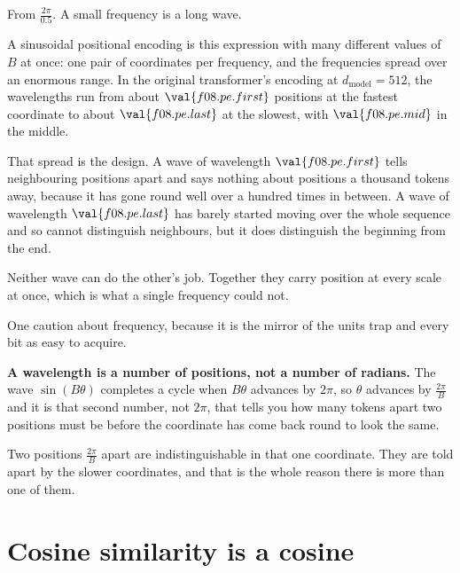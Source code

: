 \begin{fr}
\ans{$4\pi$}
From $\frac{2\pi}{\num{0.5}}$. A small frequency is a long wave.

\begin{aibox}
A sinusoidal positional encoding is this expression with many different values
of $B$ at once: one pair of coordinates per frequency, and the frequencies
spread over an enormous range. In the original transformer's encoding at
$d_{\text{model}} = 512$, the wavelengths run from about
$\val{f08.pe.first}$ positions at the fastest coordinate to about
$\val{f08.pe.last}$ at the slowest, with $\val{f08.pe.mid}$ in the middle.

That spread is the design. A wave of wavelength $\val{f08.pe.first}$ tells
neighbouring positions apart and says nothing about positions a thousand
tokens away, because it has gone round well over a hundred times in between.
A wave of
wavelength $\val{f08.pe.last}$ has barely started moving over the whole
sequence and so cannot distinguish neighbours, but it does distinguish the
beginning from the end.

Neither wave can do the other's job. Together they carry position at every
scale at once, which is what a single frequency could not.
\end{aibox}
\end{fr}

\begin{fr}
One caution about frequency, because it is the mirror of the units trap and
every bit as easy to acquire.

\textbf{A wavelength is a number of positions, not a number of radians.} The
wave $\sin(B\theta)$ completes a cycle when $B\theta$ advances by $2\pi$, so
$\theta$ advances by $\frac{2\pi}{B}$ \dash{} and it is that second number,
not $2\pi$, that tells you how many tokens apart two positions must be before
the coordinate has come back round to look the same.

Two positions $\frac{2\pi}{B}$ apart are indistinguishable in that one
coordinate. They are told apart by the slower coordinates, and that is the
whole reason there is more than one of them.
\end{fr}

\section{Cosine similarity is a cosine}
\label{sec:F08-cosine-similarity}

